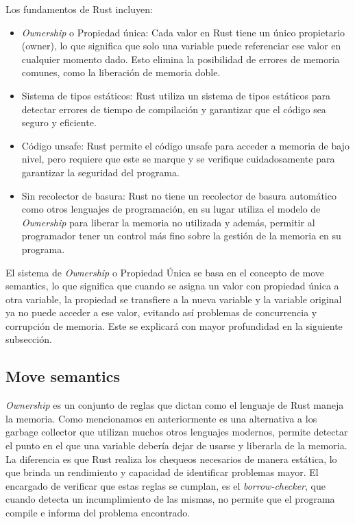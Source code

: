 Los fundamentos de Rust incluyen:
\begin{itemize}
  \item \textit{Ownership} o Propiedad única: Cada valor en Rust tiene un único propietario (owner), lo que significa que solo una variable puede referenciar ese valor en cualquier momento dado. Esto elimina la posibilidad de errores de memoria comunes, como la liberación de memoria doble.
  \item Sistema de tipos estáticos: Rust utiliza un sistema de tipos estáticos para detectar errores de tiempo de compilación y garantizar que el código sea seguro y eficiente.
  \item Código unsafe: Rust permite el código unsafe para acceder a memoria de bajo nivel, pero requiere que este se marque y se verifique cuidadosamente para garantizar la seguridad del programa.
  \item Sin recolector de basura: Rust no tiene un recolector de basura automático como otros lenguajes de programación, en su lugar utiliza el modelo de \textit{Ownership} para liberar la memoria no utilizada y además, permitir al programador tener un control más fino sobre la gestión de la memoria en su programa.
\end{itemize}  

El sistema de \textit{Ownership} o Propiedad Única se basa en el concepto de move semantics, lo que significa que cuando se asigna un valor con propiedad única a otra variable, la propiedad se transfiere a la nueva variable y la variable original ya no puede acceder a ese valor, evitando así problemas de concurrencia y corrupción de memoria. Este se explicará con mayor profundidad en la siguiente subsección. 

\subsection{Move semantics}

\textit{Ownership} es un conjunto de reglas que dictan como el lenguaje de Rust maneja la memoria. Como mencionamos en anteriormente es una alternativa a los garbage collector que utilizan muchos otros lenguajes modernos, permite detectar el punto en el que una variable debería dejar de usarse y liberarla de la memoria. La diferencia es que Rust realiza los chequeos necesarios de manera estática, lo que brinda un rendimiento y capacidad de identificar problemas mayor. El encargado de verificar que estas reglas se cumplan, es el \textit{borrow-checker}, que cuando detecta un incumplimiento de las mismas, no permite que el programa compile e informa del problema encontrado.

